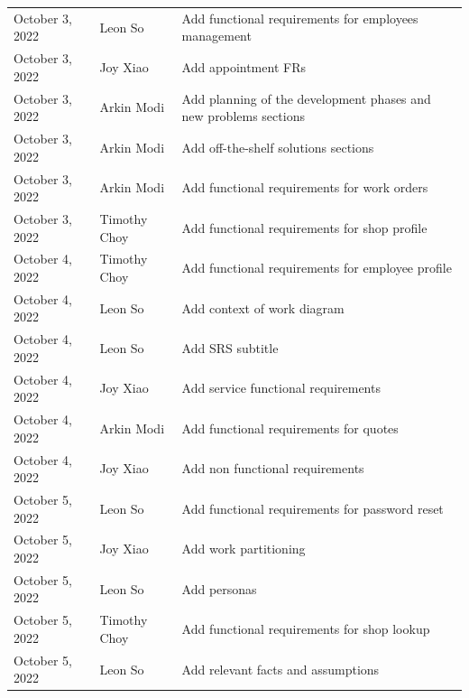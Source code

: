 \documentclass[12pt]{article}
\begin{document}
\begin{table}[hp]
\begin{tabularx}{\textwidth}{llX}
		October 3, 2022    & Leon So               & Add functional requirements for employees management                               \\
		October 3, 2022    & Joy Xiao              & Add appointment FRs                                                                \\
		October 3, 2022    & Arkin Modi            & Add planning of the development phases and new problems sections                   \\
		October 3, 2022    & Arkin Modi            & Add off-the-shelf solutions sections                                               \\
		October 3, 2022    & Arkin Modi            & Add functional requirements for work orders                                        \\
		October 3, 2022    & Timothy Choy          & Add functional requirements for shop profile                                       \\
		October 4, 2022    & Timothy Choy          & Add functional requirements for employee profile                                   \\
		October 4, 2022    & Leon So               & Add context of work diagram                                                        \\
		October 4, 2022    & Leon So               & Add SRS subtitle                                                                   \\
		October 4, 2022    & Joy Xiao              & Add service functional requirements                                                \\
		October 4, 2022    & Arkin Modi            & Add functional requirements for quotes                                             \\
		October 4, 2022    & Joy Xiao              & Add non functional requirements                                                    \\
		October 5, 2022    & Leon So               & Add functional requirements for password reset                                     \\
		October 5, 2022    & Joy Xiao              & Add work partitioning                                                              \\
		October 5, 2022    & Leon So               & Add personas                                                                       \\
		October 5, 2022    & Timothy Choy          & Add functional requirements for shop lookup                                        \\
		October 5, 2022    & Leon So               & Add relevant facts and assumptions                                                 \\
		\bottomrule
	\end{tabularx}
\end{table}
\end{document}
